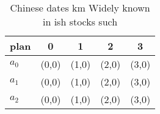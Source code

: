 \documentclass[a4paper]{article}
\begin{document}
\begin{table}
\begin{adjustbox}{width=0.6\columnwidth}
\begin{tabular}{|l|l|l|l|l|}
\hline
\textbf{plan} & \multicolumn{1}{c|}{\textbf{0}} & \multicolumn{1}{c|}{\textbf{1}} & \multicolumn{1}{c|}{\textbf{2}} & \multicolumn{1}{c|}{\textbf{3}} \\ \hline
\textbf{$a_0$}  & (0,0) & (1,0) & (2,0) & (3,0) \\ \hline
\textbf{$a_1$}  & (0,0) & (1,0) & (2,0) & (3,0) \\ \hline
\textbf{$a_2$}  & (0,0) & (1,0) & (2,0) & (3,0) \\ \hline
\end{tabular}
\end{adjustbox}
\caption{Chinese dates km Widely known in ish stocks such 
}
\end{table}
\end{document}
